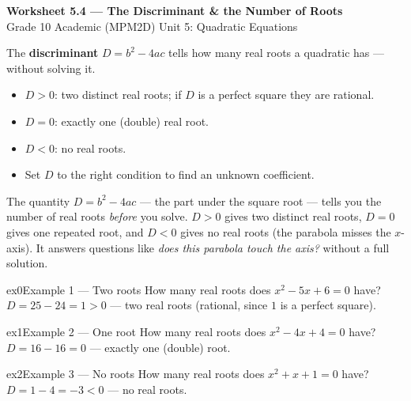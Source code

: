 \documentclass[11pt]{article}
\begin{document}
\begin{center}
{\LARGE\bfseries\color{titleblue}Worksheet 5.4 --- The Discriminant \& the Number of Roots}\\[2pt]
{\small Grade 10 Academic (MPM2D) \textperiodcentered{} Unit 5: Quadratic Equations}
\end{center}

\begin{ideabox}
The \textbf{discriminant} $D=b^2-4ac$ tells how many real roots a quadratic has --- without solving it.
\begin{itemize}[leftmargin=*,itemsep=2pt]
  \item $D>0$: two distinct real roots; if $D$ is a perfect square they are rational.
  \item $D=0$: exactly one (double) real root.
  \item $D<0$: no real roots.
  \item Set $D$ to the right condition to find an unknown coefficient.
\end{itemize}
\end{ideabox}

\begin{learnbox}
The quantity $D=b^2-4ac$ — the part under the square root — tells you the number of real roots \emph{before} you solve.
$D>0$ gives two distinct real roots, $D=0$ gives one repeated root, and $D<0$ gives no real roots (the parabola misses the $x$-axis).
It answers questions like \emph{does this parabola touch the axis?} without a full solution.
\end{learnbox}


\begin{example}{ex0}{Example 1 --- Two roots}
How many real roots does $x^2-5x+6=0$ have?
\soln $D=25-24=1>0$ --- two real roots (rational, since $1$ is a perfect square).
\end{example}

\begin{example}{ex1}{Example 2 --- One root}
How many real roots does $x^2-4x+4=0$ have?
\soln $D=16-16=0$ --- exactly one (double) root.
\end{example}

\begin{example}{ex2}{Example 3 --- No roots}
How many real roots does $x^2+x+1=0$ have?
\soln $D=1-4=-3<0$ --- no real roots.
\end{example}
\end{document}
